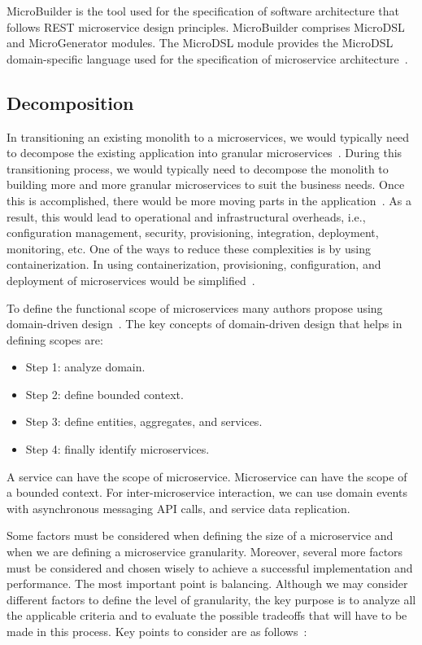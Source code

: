 \par MicroBuilder is the tool used for the specification of software architecture that follows REST microservice design principles. MicroBuilder comprises MicroDSL and MicroGenerator modules. The MicroDSL module provides the MicroDSL domain-specific language used for the specification of microservice architecture~\cite{Branko2018}.


\subsection{Decomposition}%

In transitioning an existing monolith to a microservices, we would typically need to decompose the existing application into granular microservices~\cite{Taibi2019}. During this transitioning process, we would typically need to decompose the monolith to building more and more granular microservices to suit the business needs. Once this is accomplished, there would be more moving parts in the application~\cite{Carvalho2019}. As a result, this would lead to operational and infrastructural overheads, i.e., configuration management, security, provisioning, integration, deployment, monitoring, etc. One of the ways to reduce these complexities is by using containerization. In using containerization, provisioning, configuration, and deployment of microservices would be simplified~\cite{Zhang2019}.

\par To define the functional scope of microservices many authors propose using domain-driven design~\cite{Merson2020, neves2019, Zrzavy2020}. 
The key concepts of domain-driven design that helps in defining scopes are: 

\begin{itemize}
\item Step 1: analyze domain.
\item Step 2: define bounded context.
\item Step 3: define entities, aggregates, and services. 
\item Step 4: finally identify microservices. 
\end{itemize}

A service can have the scope of microservice. Microservice can have the scope of a bounded context. For inter-microservice interaction, we can use domain events with asynchronous messaging API calls, and service data replication.

\par Some factors must be considered when defining the size of a microservice and when we are defining a microservice granularity. Moreover, several more factors must be considered and chosen wisely to achieve a successful implementation and performance.
The most important point is balancing. Although we may consider different factors to define the level of granularity, the key purpose is to analyze all the applicable criteria and to evaluate the possible tradeoffs that will have to be made in this process. Key points to consider are as follows~\cite{Yan2020}:


